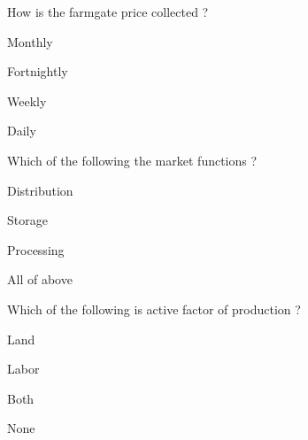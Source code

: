 \begin{questions}
\question How is the farmgate price collected ?
\begin{items}
\item* Monthly
\item Fortnightly
\item Weekly
\item Daily
\end{items}

\question Which of the following the market functions ?
\begin{items}
\item Distribution
\item Storage
\item Processing
\item* All of above
\end{items}

\question Which of the following is active factor of production ?
\begin{items}
\item Land
\item* Labor
\item Both
\item None
\end{items}

\end{questions}
